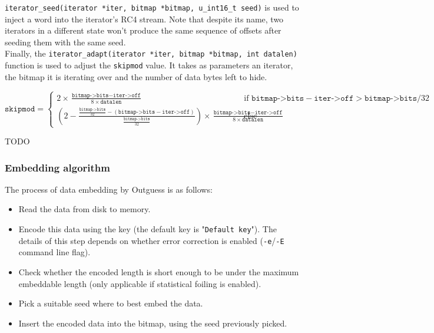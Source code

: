 \documentclass{article}
\begin{document}
\texttt{iterator\_seed(iterator *iter, bitmap *bitmap, u\_int16\_t seed)} is used to inject a word into the iterator's RC4 stream. Note that despite its name, two iterators in a different state won't produce the same sequence of offsets after seeding them with the same seed. \\

Finally, the \texttt{iterator\_adapt(iterator *iter, bitmap *bitmap, int datalen)} function is used to adjust the \texttt{skipmod} value. It takes as parameters an iterator, the bitmap it is iterating over and the number of data bytes left to hide.

\[
	\texttt{skipmod} = \begin{cases}
			2 \times \frac {\texttt{bitmap->bits} - \texttt{iter->off}} {8 \times \texttt{datalen}} & \text{if } \texttt{bitmap->bits} - \texttt{iter->off} > \texttt{bitmap->bits}/32 \\
			\left( 2 - \frac {\frac {\texttt{bitmap->bits}} {32} - (\texttt{bitmap->bits} - \texttt{iter->off})} {\frac {\texttt{bitmap->bits}} {32}} \right) \times \frac {\texttt{bitmap->bits} - \texttt{iter->off}} {8 \times \texttt{datalen}} & \text{else}
			
		\end{cases}
\]

{\color{red} TODO}

\subsubsection{Embedding algorithm}

The process of data embedding by Outguess is as follows:
\begin{itemize}
	\item Read the data from disk to memory.
	\item Encode this data using the key (the default key is "\texttt{Default key}"). The details of this step depends on whether error correction is enabled (\texttt{-e}/\texttt{-E} command line flag).
	\item Check whether the encoded length is short enough to be under the maximum embeddable length (only applicable if statistical foiling is enabled).
	\item Pick a suitable seed where to best embed the data.
	\item Insert the encoded data into the bitmap, using the seed previously picked.
\end{itemize}
\end{document}
